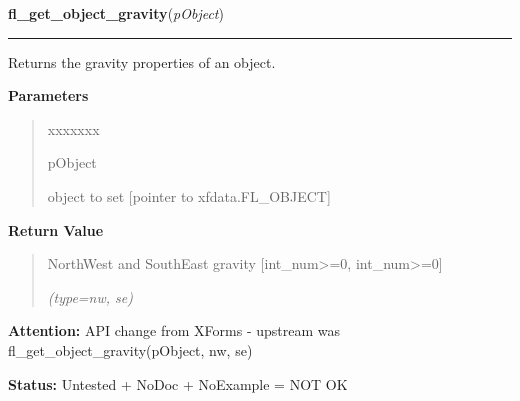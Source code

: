    \vspace{0.5ex}

\hspace{.8\funcindent}\begin{boxedminipage}{\funcwidth}

    \raggedright \textbf{fl\_get\_object\_gravity}(\textit{pObject})

    \vspace{-1.5ex}

    \rule{\textwidth}{0.5\fboxrule}
\setlength{\parskip}{2ex}
    Returns the gravity properties of an object.

\setlength{\parskip}{1ex}
      \textbf{Parameters}
      \vspace{-1ex}

      \begin{quote}
        \begin{Ventry}{xxxxxxx}

          \item[pObject]

          object to set [pointer to xfdata.FL\_OBJECT]

        \end{Ventry}

      \end{quote}

      \textbf{Return Value}
    \vspace{-1ex}

      \begin{quote}
      NorthWest and SouthEast gravity [int\_num{\textgreater}=0, 
      int\_num{\textgreater}=0]

      {\it (type=nw, se)}

      \end{quote}

\textbf{Attention:} API change from XForms - upstream was fl\_get\_object\_gravity(pObject, nw,
se)



\textbf{Status:} Untested + NoDoc + NoExample = NOT OK



    \end{boxedminipage}

    \label{xformslib:library:fl_set_object_lsize}

    \vspace{0.5ex}

